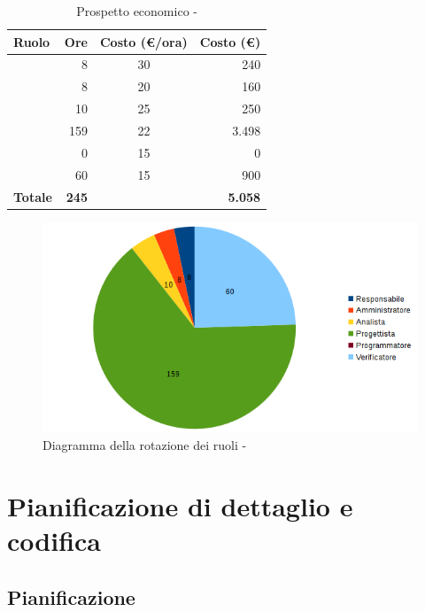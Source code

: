 \documentclass[12pt,a4paper]{article}
\begin{document}
\begin{table}[H]
	\begin{center}
		\begin{tabular}{l r c r}
			\toprule
			\textbf{Ruolo}	& \textbf{Ore} & \textbf{Costo (\euro/ora)}	& \textbf{Costo (\euro)} \\ \midrule
			\midrule
			\RE & 8 & 30 & 240 \\ \midrule
			\AM & 8 & 20 & 160 \\ \midrule
			\AN & 10 & 25 & 250 \\ \midrule
			\PG & 159 & 22 & 3.498 \\ \midrule
			\PR & 0 & 15 & 0 \\ \midrule
			\VR & 60 & 15 & 900 \\ \midrule
			\textbf{Totale} & \textbf{245} &  & \textbf{5.058} \\
			\bottomrule
		\end{tabular}
		\caption{Prospetto economico - \FPA}
	\end{center}
\end{table}

\begin{center}
	\begin{figure}[H]
		\centering		\includegraphics[width=\textwidth]{diagrammaTortaProgettazioneArchitetturaleTotaleOre.png}
		\caption{Diagramma della rotazione dei ruoli - \FPA}
	\end{figure}
\end{center}

\newpage
\section{Pianificazione di dettaglio e codifica} %

\subsection{Pianificazione}
\end{document}
